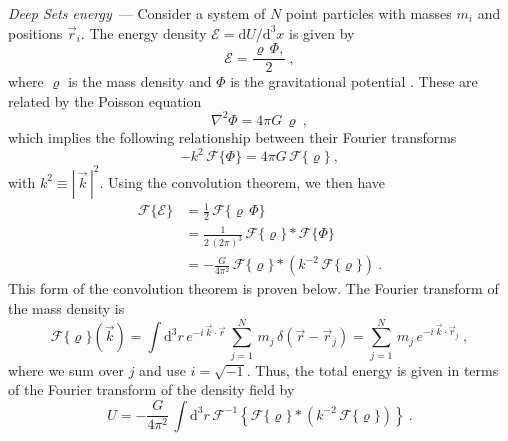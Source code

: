\documentclass[10pt]{article}
\renewcommand{\paragraph}[1]{\par\addvspace{1em}\noindent\textsl{#1}~---}
\renewcommand{\d}{\mathrm{d}}
\newcommand{\abs}[1]{|\,{#1}\,|}
\begin{document}
\paragraph{Deep Sets energy} Consider a system of $N$ point particles with masses $m_i$ and positions $\vec{r}_i$.
The energy density $\mathcal{E} = \d U / \d^3 x$ is given by
\begin{equation}
    \mathcal{E} = \frac{\varrho \, \Phi,}{2}~,
\end{equation}
where $\varrho$ is the mass density and $\Phi$ is the gravitational potential \citep{LandauLifshitzFields}.
These are related by the Poisson equation
\begin{equation}
    \nabla^2 \Phi = 4 \pi G \, \varrho~,
\end{equation}
which implies the following relationship between their Fourier transforms
\begin{equation}
    -k^2 \, \mathcal{F}\{\Phi\} = 4 \pi G \, \mathcal{F}\{\varrho\}~,
\end{equation}
with $k^2 \equiv \abs{\vec{k}}^2$.
Using the convolution theorem, we then have
\begin{align}
    \mathcal{F}\{\mathcal{E}\}
    &= \frac{1}{2} \, \mathcal{F}\{\varrho \, \Phi\} \nonumber\\
    &= \frac{1}{2 \, (2\pi)^3} \, \mathcal{F}\{\varrho\} \ast \mathcal{F}\{\Phi\} \nonumber\\
    &= -\frac{G}{4\pi^2} \, \mathcal{F}\{\varrho\} \ast \left( k^{-2} \, \mathcal{F}\{\varrho\} \right)~.
    \label{eq:ConvolutionThm}
\end{align}
This form of the convolution theorem is proven below.
The Fourier transform of the mass density is
\begin{equation}
    \mathcal{F}\{\varrho\}(\vec{k})
    = \int \d^3 r
        \, e^{-i \, \vec{k} \cdot \vec{r}}
        \, \sum_{j=1}^{N}
        \, m_j
        \, \delta(\vec{r} - \vec{r}_j)
    = \sum_{j=1}^{N} \, m_j \, e^{-i \, \vec{k} \cdot \vec{r}_j}~,
\end{equation}
where we sum over $j$ and use $i=\sqrt{-1}$.
Thus, the total energy is given in terms of the Fourier transform of the density field by
\begin{equation}
    U 
    = -\frac{G}{4 \pi^2} \,
        \int \d^3 r \,
        \mathcal{F}^{-1} \! \left\{
            \mathcal{F}\{\varrho\} \ast \left(
            k^{-2} \, \mathcal{F}\{\varrho\} \right)
        \right\}~.
\end{equation}
\end{document}
